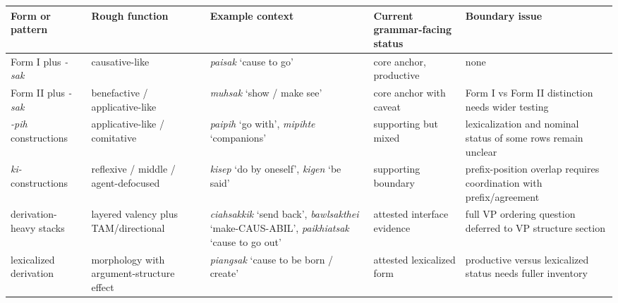\documentclass[
  11pt,
  a4paper,
]{article}
\newcounter{none} %
\newcommand{\tdim}[1]{\textit{#1}}
\newcommand{\glossquote}[1]{`#1'}
\begin{document}
{\def\LTcaptype{none} %
\begin{longtable}[]{@{}
  >{\raggedright\arraybackslash}p{}
  >{\raggedright\arraybackslash}p{}
  >{\raggedright\arraybackslash}p{}
  >{\raggedright\arraybackslash}p{}
  >{\raggedright\arraybackslash}p{}@{}}
\toprule\noalign{}
\begin{minipage}[b]{\linewidth}\raggedright
Form or pattern
\end{minipage} & \begin{minipage}[b]{\linewidth}\raggedright
Rough function
\end{minipage} & \begin{minipage}[b]{\linewidth}\raggedright
Example context
\end{minipage} & \begin{minipage}[b]{\linewidth}\raggedright
Current grammar-facing status
\end{minipage} & \begin{minipage}[b]{\linewidth}\raggedright
Boundary issue
\end{minipage} \\
\midrule\noalign{}
\endhead
\bottomrule\noalign{}
\endlastfoot
Form I plus \tdim{-sak} & causative-like & \tdim{paisak}
\glossquote{cause to go} & core anchor, productive & none \\
Form II plus \tdim{-sak} & benefactive / applicative-like &
\tdim{muhsak} \glossquote{show / make see} & core anchor with caveat &
Form I vs Form II distinction needs wider testing \\
\tdim{-pih} constructions & applicative-like / comitative &
\tdim{paipih} \glossquote{go with}, \tdim{mipihte}
\glossquote{companions} & supporting but mixed & lexicalization and
nominal status of some rows remain unclear \\
\tdim{ki-} constructions & reflexive / middle / agent-defocused &
\tdim{kisep} \glossquote{do by oneself}, \tdim{kigen}
\glossquote{be said} & supporting boundary & prefix-position overlap
requires coordination with prefix/agreement \\
derivation-heavy stacks & layered valency plus TAM/directional &
\tdim{ciahsakkik} \glossquote{send back}, \tdim{bawlsakthei}
\glossquote{make-CAUS-ABIL}, \tdim{paikhiatsak}
\glossquote{cause to go out} & attested interface evidence & full VP
ordering question deferred to VP structure section \\
lexicalized derivation & morphology with argument-structure effect &
\tdim{piangsak} \glossquote{cause to be born / create} & attested
lexicalized form & productive versus lexicalized status needs fuller
inventory \\
\end{longtable}
}
\end{document}
